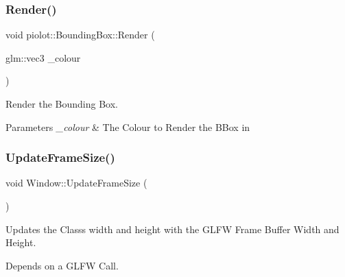 \subsubsection{\texorpdfstring{Render()}{Render()}}
{\footnotesize\ttfamily void piolot\+::\+Bounding\+Box\+::\+Render (\begin{DoxyParamCaption}\item[{glm\+::vec3}]{\+\_\+colour }\end{DoxyParamCaption})}



Render the Bounding Box. 


\begin{DoxyParams}{Parameters}
{\em \+\_\+colour} & The Colour to Render the B\+Box in \\
\hline
\end{DoxyParams}
\mbox{\label{group___getters_gac825ddc0aeda29fae94c5fc910f3f04d}} 
\subsubsection{\texorpdfstring{Update\+Frame\+Size()}{UpdateFrameSize()}}
{\footnotesize\ttfamily void Window\+::\+Update\+Frame\+Size (\begin{DoxyParamCaption}{ }\end{DoxyParamCaption})}



Updates the Class\textquotesingle{}s width and height with the G\+L\+FW Frame Buffer Width and Height. 

Depends on a G\+L\+FW Call. 